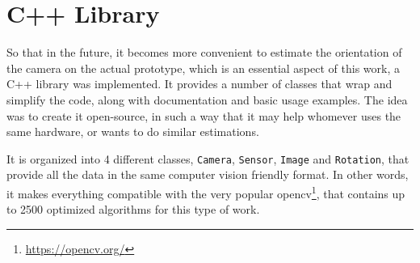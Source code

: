 \section{C++ Library}
\label{diwefneoinfof}

So that in the future, it becomes more convenient to estimate the orientation of the camera on the actual prototype, which is an essential aspect of this work, a C++ library was implemented. It provides a number of classes that wrap and simplify the code, along with documentation and basic usage examples. The idea was to create it open-source, in such a way that it may help whomever uses the same hardware, or wants to do similar estimations.

It is organized into 4 different classes, \texttt{Camera}, \texttt{Sensor}, \texttt{Image} and \texttt{Rotation}, that provide all the data in the same computer vision friendly format. In other words, it makes everything compatible with the very popular \acrlong{opencv}\footnote{\href{https://opencv.org/}{https://opencv.org/}}, that contains up to 2500 optimized algorithms for this type of work.


